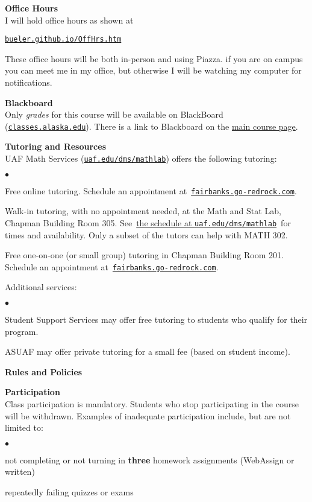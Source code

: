\documentclass[12pt]{article}
\renewcommand{\emph}[1]{\textsf{\textbf{#1}}}
\newcommand{\localhead}[1]{\par\smallskip\textbf{#1}\nobreak\\}%
\def\heading#1{\localhead{\large\emph{#1}}}
\def\subheading#1{\localhead{\emph{#1}}}
\newenvironment{clist}%
{\bgroup\parskip 0pt\begin{list}{$\bullet$}{\partopsep 4pt\topsep 0pt\itemsep -2pt}}%
{\end{list}\egroup}%
\begin{document}
\heading{Office Hours}
I will hold office hours as shown at

\smallskip
\centerline{\href{http://bueler.github.io/OffHrs.htm}{\tt bueler.github.io/OffHrs.htm}}

These office hours will be both in-person and using Piazza.  if you are on campus you can meet me in my office, but otherwise I will be watching my computer for notifications.


\heading{Blackboard}
Only \textsl{grades} for this course will be available on BlackBoard (\href{https://classes.alaska.edu/}{\tt classes.alaska.edu}).  There is a link to Blackboard on the \href{https://bueler.github.io/math302/}{main course page}.


\heading{Tutoring and Resources}
UAF Math Services (\href{http://www.uaf.edu/dms/mathlab/}{\texttt{uaf.edu/dms/mathlab}}) offers the following tutoring:
\begin{clist}
	\item Free online tutoring.  Schedule an appointment at\, \href{https://fairbanks.go-redrock.com/}{\texttt{fairbanks.go-redrock.com}}.
	\item Walk-in tutoring, with no appointment needed, at the Math and Stat Lab, Chapman Building Room 305.  See\, \href{https://uaf.edu/dms/mathlab/math-and-stat-lab-schedul-1/}{the schedule at \texttt{uaf.edu/dms/mathlab}}\, for times and availability.  Only a subset of the tutors can help with MATH 302.
	\item Free one-on-one (or small group) tutoring in Chapman Building Room 201.  Schedule an appointment at\, \href{https://fairbanks.go-redrock.com/}{\texttt{fairbanks.go-redrock.com}}.
\end{clist}

Additional services:
\begin{clist}
	\item Student Support Services may offer free tutoring to students who qualify for their program.
	\item ASUAF may offer private tutoring for a small fee (based on student income).
\end{clist}


\newpage
\strut

\heading{Rules and Policies}
\vskip -20pt
\subheading{Participation}
Class participation is mandatory.  Students who stop participating in the course will be withdrawn.  Examples of inadequate participation include, but are not limited to:

\begin{clist}
\item not completing or not turning in \textbf{three} homework assignments (WebAssign or written)
\item repeatedly failing quizzes or exams
\end{clist}
\end{document}
